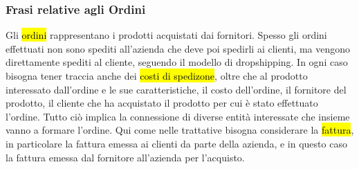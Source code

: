 \subsubsection{Frasi relative agli Ordini}
Gli \hl{ordini} rappresentano i prodotti acquistati dai fornitori. Spesso gli ordini effettuati non sono spediti all'azienda che deve poi spedirli ai clienti, ma vengono direttamente spediti al cliente, seguendo il modello di dropshipping. In ogni caso bisogna tener traccia anche dei \hl{costi di spedizone}, oltre che al prodotto interessato dall'ordine e le sue caratteristiche, il costo dell'ordine, il fornitore del prodotto, il cliente che ha acquistato il prodotto per cui è stato effettuato l'ordine. Tutto ciò implica la connessione di diverse entità interessate che insieme vanno a formare l'ordine. Qui come nelle trattative bisogna considerare la \hl{fattura}, in particolare la fattura emessa ai clienti da parte della azienda, e in questo caso la fattura emessa dal fornitore all'azienda per l'acquisto.